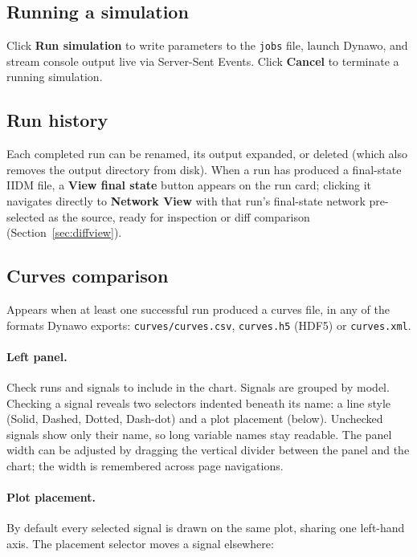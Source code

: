 \documentclass[a4paper,11pt]{article}
\newcommand{\code}[1]{\texttt{\small #1}}
\newcommand{\ftype}[1]{\texttt{\small\color{rteblu}#1}}
\begin{document}
\subsection{Running a simulation}

Click \textbf{Run simulation} to write parameters to the \ftype{jobs} file,
launch Dynawo, and stream console output live via Server-Sent Events. Click
\textbf{Cancel} to terminate a running simulation.

\subsection{Run history}

Each completed run can be renamed, its output expanded, or deleted (which also
removes the output directory from disk). When a run has produced a final-state
IIDM file, a \textbf{View final state} button appears on the run card; clicking
it navigates directly to \textbf{Network View} with that run's final-state
network pre-selected as the source, ready for inspection or diff comparison
(Section~\ref{sec:diffview}).

\subsection{Curves comparison}
\label{sec:curves}

Appears when at least one successful run produced a curves file, in any of
the formats Dynawo exports: \code{curves/curves.csv}, \code{curves.h5}
(HDF5) or \code{curves.xml}.

\paragraph{Left panel.} Check runs and signals to include in the chart.
Signals are grouped by model. Checking a signal reveals two selectors indented
beneath its name: a line style (Solid, Dashed, Dotted, Dash-dot) and a plot
placement (below). Unchecked signals show only their name, so long variable
names stay readable. The panel width can be adjusted by dragging the vertical
divider between the panel and the chart; the width is remembered across page
navigations.

\paragraph{Plot placement.} By default every selected signal is drawn on the
same plot, sharing one left-hand axis. The placement selector moves a signal
elsewhere:
\end{document}
